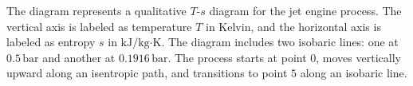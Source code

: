 The diagram represents a qualitative \( T \)-\( s \) diagram for the jet engine process. The vertical axis is labeled as temperature \( T \) in Kelvin, and the horizontal axis is labeled as entropy \( s \) in \( \text{kJ}/\text{kg·K} \). The diagram includes two isobaric lines: one at \( 0.5 \, \text{bar} \) and another at \( 0.1916 \, \text{bar} \). The process starts at point \( 0 \), moves vertically upward along an isentropic path, and transitions to point \( 5 \) along an isobaric line.